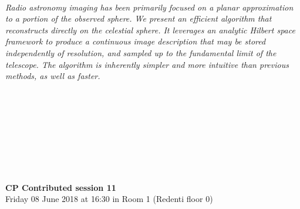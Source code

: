 \begin{multicols}{2}
\\
    \textit{Radio astronomy imaging has been primarily focused on a planar approximation to a portion of the observed sphere. We present an efficient algorithm that reconstructs directly on the celestial sphere. It leverages an analytic Hilbert space framework to produce a continuous image description that may be stored independently of resolution, and sampled up to the fundamental limit of the telescope. The algorithm is inherently simpler and more intuitive than previous methods, as well as faster.}\\
\\ 
      \\
      \\\\
      \\
      \\\\
\\
  \end{multicols}
  \noindent\textbf{CP Contributed session 11}\\
    Friday 08 June 2018 at 16:30 in Room 1 (Redenti floor 0)  \\
  \textit{} \\
    
